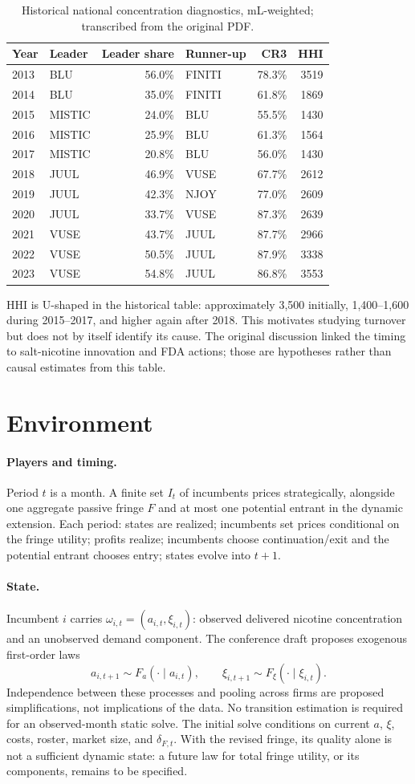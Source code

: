 \documentclass[11pt]{article}
\begin{document}
\begin{table}[htbp]\centering\small
\begin{tabular}{llrlrr}\toprule
Year&Leader&Leader share&Runner-up&CR3&HHI\\\midrule
2013&BLU&56.0\%&FINITI&78.3\%&3519\\
2014&BLU&35.0\%&FINITI&61.8\%&1869\\
2015&MISTIC&24.0\%&BLU&55.5\%&1430\\
2016&MISTIC&25.9\%&BLU&61.3\%&1564\\
2017&MISTIC&20.8\%&BLU&56.0\%&1430\\
2018&JUUL&46.9\%&VUSE&67.7\%&2612\\
2019&JUUL&42.3\%&NJOY&77.0\%&2609\\
2020&JUUL&33.7\%&VUSE&87.3\%&2639\\
2021&VUSE&43.7\%&JUUL&87.7\%&2966\\
2022&VUSE&50.5\%&JUUL&87.9\%&3338\\
2023&VUSE&54.8\%&JUUL&86.8\%&3553\\\bottomrule
\end{tabular}
\caption{Historical national concentration diagnostics, mL-weighted; transcribed from the original PDF.}
\end{table}
HHI is U-shaped in the historical table: approximately 3,500 initially, 1,400--1,600 during 2015--2017, and higher again after 2018. This motivates studying turnover but does not by itself identify its cause. The original discussion linked the timing to salt-nicotine innovation and FDA actions; those are hypotheses rather than causal estimates from this table.

\section{Environment}
\paragraph{Players and timing.} Period $t$ is a month. A finite set $I_t$ of incumbents prices strategically, alongside one aggregate passive fringe $F$ and at most one potential entrant in the dynamic extension. Each period: states are realized; incumbents set prices conditional on the fringe utility; profits realize; incumbents choose continuation/exit and the potential entrant chooses entry; states evolve into $t+1$.
\paragraph{State.} Incumbent $i$ carries $\omega_{i,t}=(a_{i,t},\xi_{i,t})$: observed delivered nicotine concentration and an unobserved demand component. The conference draft proposes exogenous first-order laws
\[
a_{i,t+1}\sim F_a(\cdot\mid a_{i,t}),\qquad
\xi_{i,t+1}\sim F_\xi(\cdot\mid\xi_{i,t}).
\]
Independence between these processes and pooling across firms are proposed simplifications, not implications of the data. No transition estimation is required for an observed-month static solve. The initial solve conditions on current $a$, $\xi$, costs, roster, market size, and $\delta_{F,t}$. With the revised fringe, its quality alone is not a sufficient dynamic state: a future law for total fringe utility, or its components, remains to be specified.
\end{document}
